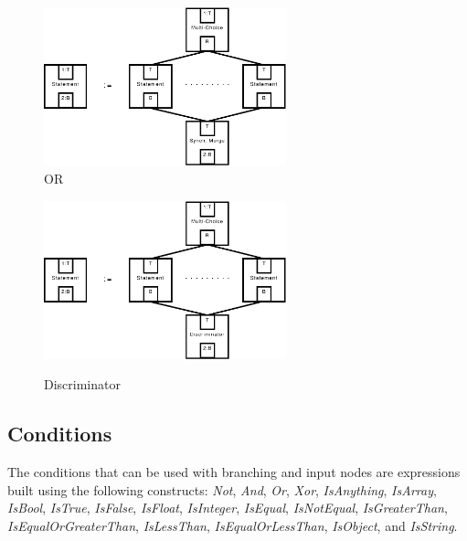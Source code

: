 \begin{figure}[htb]
  \begin{minipage}{0.45\textwidth}
    \begin{center}
      \includegraphics[width=7cm]{figures/grammar/or}\\[5mm]
      \caption[The \emph{OR} grammar rule]{OR}
      \label{figure-grammar-OR}
    \end{center}
  \end{minipage}
  \hfill
  \begin{minipage}{0.45\textwidth}
    \begin{center}
      \includegraphics[width=7cm]{figures/grammar/discriminator}\\[5mm]
      \caption[The \emph{Discriminator} grammar rule]{Discriminator}
      \label{figure-grammar-Discriminator}
    \end{center}
  \end{minipage}
\end{figure}

\subsection{Conditions}

The conditions that can be used with branching and input nodes are expressions
built using the following constructs: \emph{Not}, \emph{And}, \emph{Or},
\emph{Xor}, \emph{IsAnything}, \emph{IsArray}, \emph{IsBool}, \emph{IsTrue},
\emph{IsFalse}, \emph{IsFloat}, \emph{IsInteger}, \emph{IsEqual},
\emph{IsNotEqual}, \emph{IsGreaterThan}, \emph{IsEqualOrGreaterThan},
\emph{IsLessThan}, \emph{IsEqualOrLessThan}, \emph{IsObject}, and
\emph{IsString}.

